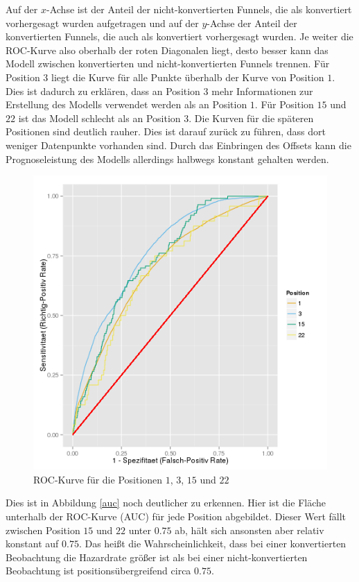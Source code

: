 Auf der $x$-Achse ist der Anteil der nicht-konvertierten Funnels, die als konvertiert vorhergesagt wurden aufgetragen und auf der $y$-Achse der Anteil der konvertierten Funnels, die auch als konvertiert vorhergesagt wurden. Je weiter die ROC-Kurve also oberhalb der roten Diagonalen liegt, desto besser kann das Modell zwischen konvertierten und nicht-konvertierten Funnels trennen. Für Position $3$ liegt die Kurve für alle Punkte überhalb der Kurve von Position $1$. Dies ist dadurch zu erklären, dass an Position $3$ mehr Informationen zur Erstellung des Modells verwendet werden als an Position $1$. Für Position $15$ und $22$ ist das Modell schlecht als an Position $3$. Die Kurven für die späteren Positionen sind deutlich rauher. Dies ist darauf zurück zu führen, dass dort weniger Datenpunkte vorhanden sind. Durch das Einbringen des Offsets kann die Prognoseleistung des Modells allerdings halbwegs konstant gehalten werden.\\
\begin{figure}[H]
	\centering\includegraphics[scale=0.75]{roc.png}\caption{ROC-Kurve für die Positionen $1$, $3$, $15$ und $22$}\label{roc}
\end{figure}
Dies ist in Abbildung \ref{auc} noch deutlicher zu erkennen. Hier ist die Fläche unterhalb der ROC-Kurve (AUC) für jede Position abgebildet. Dieser Wert fällt zwischen Position $15$ und $22$ unter $0.75$ ab, hält sich ansonsten aber relativ konstant auf $0.75$. Das heißt die Wahrscheinlichkeit, dass bei einer konvertierten Beobachtung die Hazardrate größer ist als bei einer nicht-konvertierten Beobachtung ist positionsübergreifend circa $0.75$.
